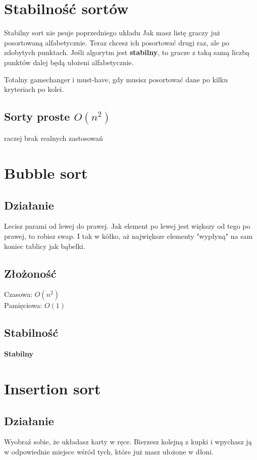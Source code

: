 \documentclass[12pt]{article}
\newcommand{\przerwa}{\vspace{0.5cm}}
\begin{document}
\tableofcontents
\section{Stabilność sortów}
Stabilny sort nie psuje poprzedniego układu 
Jak masz listę graczy już posortowaną alfabetycznie. Teraz chcesz ich posortować drugi raz, ale po zdobytych punktach. Jeśli algorytm jest \textbf{stabilny}, to gracze z taką samą liczbą punktów dalej będą ułożeni alfabetycznie.

Totalny gamechanger i must-have, gdy musisz posortować dane po kilku kryteriach po kolei.

\przerwa

\begin{center}
 \section*{Sorty proste $O(n^2)$}
 raczej brak realnych zastosowań
\end{center}

\section{Bubble sort}
\subsection{Działanie}
Lecisz parami od lewej do prawej. Jak element po lewej jest większy od tego po prawej, to robisz swap. I tak w kółko, aż największe elementy "wypłyną" na sam koniec tablicy jak bąbelki. 
\subsection{Złożoność}
Czasowa: $O(n^2)$ \\
Pamięciowa: $O(1)$
\subsection{Stabilność}
\textbf{Stabilny}

\section{Insertion sort}
\subsection{Działanie}
Wyobraź sobie, że układasz karty w ręce. Bierzesz kolejną z kupki i wpychasz ją w odpowiednie miejsce wśród tych, które już masz ułożone w dłoni. 
\end{document}
